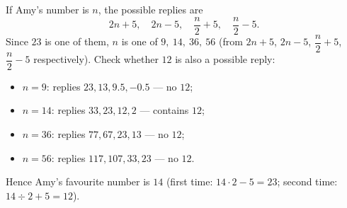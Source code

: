 If Amy's number is $n$, the possible replies are
\[
2n+5,\quad 2n-5,\quad \dfrac {n}{2}+5,\quad \dfrac {n}{2}-5 .
\]
Since $23$ is one of them, $n$ is one of $9,\ 14,\ 36,\ 56$ (from $2n+5$, $2n-5$, $\dfrac {n}{2}+5$, $\dfrac {n}{2}-5$ respectively). Check whether $12$ is also a possible reply:
\begin{itemize}
\item $n=9$: replies $23,13,9.5,-0.5$ --- no $12$;
\item $n=14$: replies $33,23,12,2$ --- contains $12$;
\item $n=36$: replies $77,67,23,13$ --- no $12$;
\item $n=56$: replies $117,107,33,23$ --- no $12$.
\end{itemize}
Hence Amy's favourite number is $\boxed{14}$ (first time: $14\cdot2-5=23$; second time: $14\div2+5=12$).
